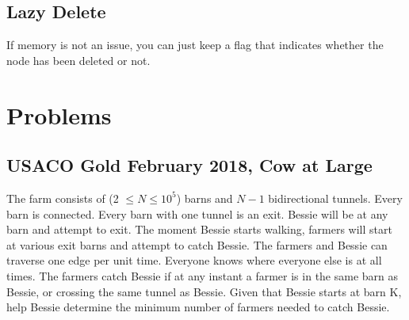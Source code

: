 \documentclass{article}
\begin{document}
\subsection{Lazy Delete}
If memory is not an issue, you can just keep a flag that indicates whether the node has been deleted or not. 

\section{Problems}
\subsection{USACO Gold February 2018, Cow at Large}
The farm consists of (2 $\leq N \leq 10^5$) barns and $N-1$ bidirectional tunnels. Every barn is connected. Every barn with one tunnel is an exit. Bessie will be at any barn and attempt to exit. The moment Bessie starts walking, farmers will start at various exit barns and attempt to catch Bessie. The farmers and Bessie can traverse one edge per unit time. Everyone knows where everyone else is at all times. The farmers catch Bessie if at any instant a farmer is in the same barn as Bessie, or crossing the same tunnel as Bessie. Given that Bessie starts at barn K, help Bessie determine the minimum number of farmers needed to catch Bessie.
\end{document}
